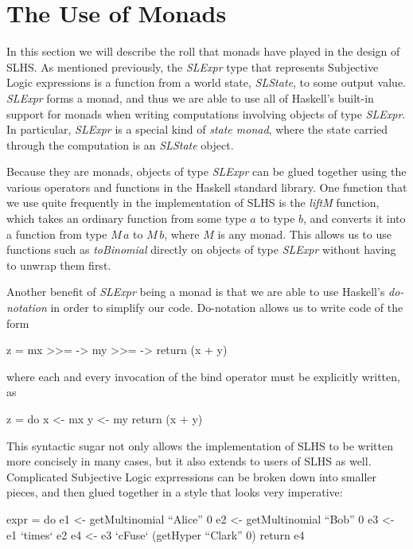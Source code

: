 \documentclass[thesis.tex]{subfiles}
\begin{document}
\section{The Use of Monads}

In this section we will describe the roll that monads have played in the design of SLHS. As mentioned
previously, the \emph{SLExpr} type that represents Subjective Logic expressions is a function from
a world state, \emph{SLState}, to some output value. \emph{SLExpr} forms a monad, and thus we are
able to use all of Haskell's built-in support for monads when writing computations involving
objects of type \emph{SLExpr}. In particular, \emph{SLExpr} is a special kind of \emph{state monad},
where the state carried through the computation is an \emph{SLState} object.

Because they are monads, objects of type \emph{SLExpr} can be glued together using the various
operators and functions in the Haskell standard library. One function that we use quite frequently
in the implementation of SLHS is the \emph{liftM} function, which takes an ordinary function from
some type $a$ to type $b$, and converts it into a function from type $M\,a$ to $M\,b$, where $M$ is
any monad. This allows us to use functions such as \emph{toBinomial} directly on objects of type
\emph{SLExpr} without having to unwrap them first.

Another benefit of \emph{SLExpr} being a monad is that we are able to use Haskell's \emph{do-notation}
in order to simplify our code. Do-notation allows us to write code of the form

\begin{spec}
z = mx >>= \x -> my >>= \y -> return (x + y)
\end{spec}

where each and every invocation of the bind operator must be explicitly written, as

\begin{spec}
z = do x <- mx
       y <- my
       return (x + y)
\end{spec}

This syntactic sugar not only allows the implementation of SLHS to be written more
concisely in many cases, but it also extends to users of SLHS as well. Complicated
Subjective Logic exprressions can be broken down into smaller pieces, and then glued
together in a style that looks very imperative:

\begin{spec}
expr = do e1 <- getMultinomial ``Alice'' 0
          e2 <- getMultinomial ``Bob'' 0
          e3 <- e1 `times` e2
          e4 <- e3 `cFuse` (getHyper ``Clark'' 0)
          return e4
\end{spec}
\end{document}
